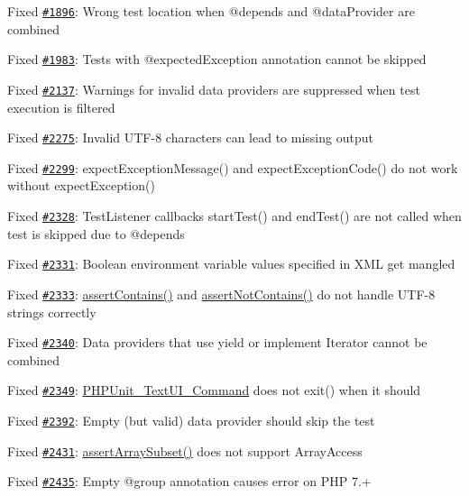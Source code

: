 \begin{DoxyItemize}
\item Fixed \href{https://github.com/sebastianbergmann/phpunit/issues/1896}{\tt \#1896}\+: Wrong test location when {\ttfamily @depends} and {\ttfamily @data\+Provider} are combined
\item Fixed \href{https://github.com/sebastianbergmann/phpunit/pull/1983}{\tt \#1983}\+: Tests with {\ttfamily @expected\+Exception} annotation cannot be skipped
\item Fixed \href{https://github.com/sebastianbergmann/phpunit/issues/2137}{\tt \#2137}\+: Warnings for invalid data providers are suppressed when test execution is filtered
\item Fixed \href{https://github.com/sebastianbergmann/phpunit/pull/2275}{\tt \#2275}\+: Invalid U\+T\+F-\/8 characters can lead to missing output
\item Fixed \href{https://github.com/sebastianbergmann/phpunit/issues/2299}{\tt \#2299}\+: {\ttfamily expect\+Exception\+Message()} and {\ttfamily expect\+Exception\+Code()} do not work without {\ttfamily expect\+Exception()}
\item Fixed \href{https://github.com/sebastianbergmann/phpunit/issues/2328}{\tt \#2328}\+: {\ttfamily Test\+Listener} callbacks {\ttfamily start\+Test()} and {\ttfamily end\+Test()} are not called when test is skipped due to {\ttfamily @depends}
\item Fixed \href{https://github.com/sebastianbergmann/phpunit/issues/2331}{\tt \#2331}\+: Boolean environment variable values specified in X\+ML get mangled
\item Fixed \href{https://github.com/sebastianbergmann/phpunit/issues/2333}{\tt \#2333}\+: {\ttfamily \mbox{\hyperlink{_functions_8php_a1cfe93764a351b03451c52f70117d26a}{assert\+Contains()}}} and {\ttfamily \mbox{\hyperlink{_functions_8php_a6a61b83692ab545b4aac71ae27437f72}{assert\+Not\+Contains()}}} do not handle U\+T\+F-\/8 strings correctly
\item Fixed \href{https://github.com/sebastianbergmann/phpunit/pull/2340}{\tt \#2340}\+: Data providers that use {\ttfamily yield} or implement {\ttfamily Iterator} cannot be combined
\item Fixed \href{https://github.com/sebastianbergmann/phpunit/pull/2349}{\tt \#2349}\+: {\ttfamily \mbox{\hyperlink{class_p_h_p_unit___text_u_i___command}{P\+H\+P\+Unit\+\_\+\+Text\+U\+I\+\_\+\+Command}}} does not {\ttfamily exit()} when it should
\item Fixed \href{https://github.com/sebastianbergmann/phpunit/issues/2392}{\tt \#2392}\+: Empty (but valid) data provider should skip the test
\item Fixed \href{https://github.com/sebastianbergmann/phpunit/issues/2431}{\tt \#2431}\+: {\ttfamily \mbox{\hyperlink{_functions_8php_a5a615e4c846b70941ea08a307b935a93}{assert\+Array\+Subset()}}} does not support {\ttfamily Array\+Access}
\item Fixed \href{https://github.com/sebastianbergmann/phpunit/issues/2435}{\tt \#2435}\+: Empty {\ttfamily @group} annotation causes error on P\+HP 7.+
\end{DoxyItemize}

